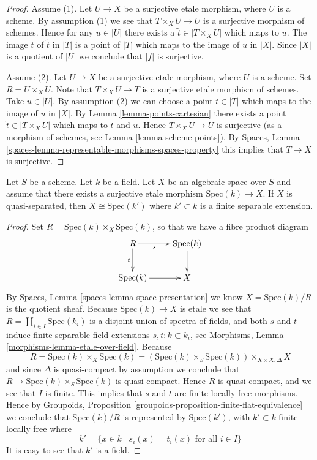 \begin{proof}
Assume (1). Let $U \to X$ be a surjective etale morphism, where $U$ is
a scheme. By assumption (1) we see that $T \times_X U \to U$ is a surjective
morphism of schemes. Hence for any $u \in |U|$ there exists a 
$\tilde t \in |T \times_X U|$ which maps to $u$. The image $t$ of $\tilde t$
in $|T|$ is a point of $|T|$ which maps to the image of $u$ in $|X|$.
Since $|X|$ is a quotient of $|U|$ we conclude that $|f|$ is surjective.

\medskip\noindent
Assume (2). Let $U \to X$ be a surjective etale morphism, where $U$ is
a scheme. Set $R = U \times_X U$. Note that $T \times_X U \to T$ is a
surjective etale morphism of schemes. Take $u \in |U|$. By assumption (2)
we can choose a point $t \in |T|$ which maps to the image of $u$ in $|X|$.
By Lemma \ref{lemma-points-cartesian} there exists a point
$\tilde t \in |T \times_X U|$ which maps to $t$ and $u$.
Hence $T \times_X U \to U$ is surjective (as a morphism of schemes,
see Lemma \ref{lemma-scheme-points}). By
Spaces, Lemma \ref{spaces-lemma-representable-morphisms-spaces-property}
this implies that $T \to X$ is surjective.
\end{proof}

\begin{lemma}
\label{lemma-point-like-spaces}
Let $S$ be a scheme. Let $k$ be a field.
Let $X$ be an algebraic space over $S$ and assume that there exists
a surjective etale morphism $\text{Spec}(k) \to X$.
If $X$ is quasi-separated, then $X \cong \text{Spec}(k')$
where $k' \subset k$ is a finite separable extension.
\end{lemma}

\begin{proof}
Set $R = \text{Spec}(k) \times_X \text{Spec}(k)$, so that we have a
fibre product diagram
$$
\xymatrix{
R \ar[r]_-s \ar[d]_-t & \text{Spec}(k) \ar[d] \\
\text{Spec}(k) \ar[r] & X
}
$$
By Spaces, Lemma \ref{spaces-lemma-space-presentation}
we know $X = \text{Spec}(k)/R$ is the quotient sheaf.
Because $\text{Spec}(k) \to X$ is etale we see that
$R = \coprod_{i \in I} \text{Spec}(k_i)$ is a disjoint
union of spectra of fields, and both $s$ and $t$
induce finite separable field extensions $s, t : k \subset k_i$,
see Morphisms, Lemma \ref{morphisms-lemma-etale-over-field}. Because
$$
R = \text{Spec}(k) \times_X \text{Spec}(k)
= (\text{Spec}(k) \times_S \text{Spec}(k)) \times_{X \times X, \Delta} X
$$
and since $\Delta$ is quasi-compact by assumption we conclude that
$R \to \text{Spec}(k) \times_S \text{Spec}(k)$ is quasi-compact.
Hence $R$ is quasi-compact, and we see that $I$ is finite. This implies
that $s$ and $t$ are finite locally free morphisms. Hence by
Groupoids, Proposition \ref{groupoids-proposition-finite-flat-equivalence}
we conclude that $\text{Spec}(k)/R$ is
represented by $\text{Spec}(k')$, with $k' \subset k$ finite locally free
where
$$
k' = \{x \in k \mid s_i(x) = t_i(x)\text{ for all }i \in I\}
$$
It is easy to see that $k'$ is a field.
\end{proof}

